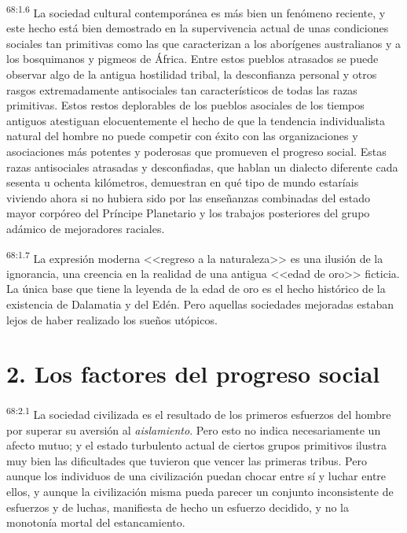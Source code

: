 \documentclass[twoside, 11pt]{book}
\begin{document}
\par
\textsuperscript{68:1.6} La sociedad cultural contemporánea es más bien un fenómeno reciente, y este hecho está bien demostrado en la supervivencia actual de unas condiciones sociales tan primitivas como las que caracterizan a los aborígenes australianos y a los bosquimanos y pigmeos de África. Entre estos pueblos atrasados se puede observar algo de la antigua hostilidad tribal, la desconfianza personal y otros rasgos extremadamente antisociales tan característicos de todas las razas primitivas. Estos restos deplorables de los pueblos asociales de los tiempos antiguos atestiguan elocuentemente el hecho de que la tendencia individualista natural del hombre no puede competir con éxito con las organizaciones y asociaciones más potentes y poderosas que promueven el progreso social. Estas razas antisociales atrasadas y desconfiadas, que hablan un dialecto diferente cada sesenta u ochenta kilómetros, demuestran en qué tipo de mundo estaríais viviendo ahora si no hubiera sido por las enseñanzas combinadas del estado mayor corpóreo del Príncipe Planetario y los trabajos posteriores del grupo adámico de mejoradores raciales.

\par
\textsuperscript{68:1.7} La expresión moderna <<regreso a la naturaleza>> es una ilusión de la ignorancia, una creencia en la realidad de una antigua <<edad de oro>> ficticia. La única base que tiene la leyenda de la edad de oro es el hecho histórico de la existencia de Dalamatia y del Edén. Pero aquellas sociedades mejoradas estaban lejos de haber realizado los sueños utópicos.

\section*{2. Los factores del progreso social}
\par
\textsuperscript{68:2.1} La sociedad civilizada es el resultado de los primeros esfuerzos del hombre por superar su aversión al \textit{aislamiento}. Pero esto no indica necesariamente un afecto mutuo; y el estado turbulento actual de ciertos grupos primitivos ilustra muy bien las dificultades que tuvieron que vencer las primeras tribus. Pero aunque los individuos de una civilización puedan chocar entre sí y luchar entre ellos, y aunque la civilización misma pueda parecer un conjunto inconsistente de esfuerzos y de luchas, manifiesta de hecho un esfuerzo decidido, y no la monotonía mortal del estancamiento.
\end{document}
